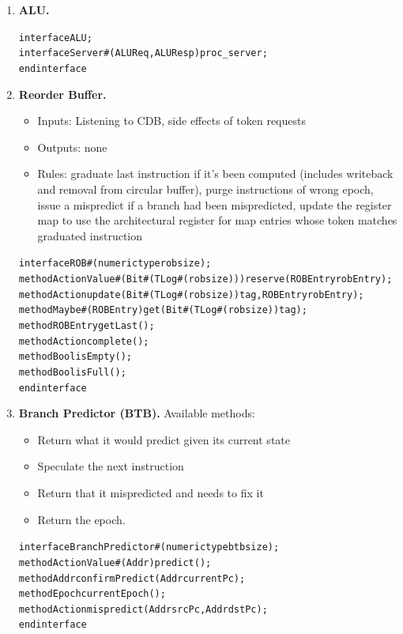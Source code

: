 \documentclass[12pt]{article}
\begin{document}
\begin{enumerate}
    \item \textbf{ALU.}
    \begin{alltt}
        interface ALU;
            interface Server#(ALUReq, ALUResp) proc_server;
        endinterface
    \end{alltt}
    
    \item \textbf{Reorder Buffer.}
    \begin{itemize}
        \item[] Inputs: Listening to CDB, side effects of token requests
        \item[] Outputs: none
        \item[] Rules: graduate last instruction if it's been computed (includes writeback and removal from circular
        buffer), purge instructions of wrong epoch, issue a mispredict if a branch had been mispredicted, update the register map to use the architectural register for map entries whose token matches graduated instruction
    \end{itemize}
    \begin{alltt}
        interface ROB#(numeric type robsize);
          method ActionValue#(Bit#(TLog#(robsize))) reserve(ROBEntry robEntry);
          method Action update(Bit#(TLog#(robsize)) tag, ROBEntry robEntry);
          method Maybe#(ROBEntry) get(Bit#(TLog#(robsize)) tag);
          method ROBEntry getLast();
          method Action complete();
          method Bool isEmpty();
          method Bool isFull();
        endinterface
    \end{alltt}

    \item \textbf{Branch Predictor (BTB).} Available methods:
        \begin{itemize}
            \item[] Return what it would predict given its current state
            \item[] Speculate the next instruction
            \item[] Return that it mispredicted and needs to fix it
            \item[] Return the epoch.
        \end{itemize}

    \begin{alltt}
        interface BranchPredictor#(numeric type btbsize);
        	method ActionValue#(Addr) predict();
        	method Addr confirmPredict(Addr currentPc);
        	method Epoch currentEpoch();
        	method Action mispredict(Addr srcPc, Addr dstPc);
        endinterface
    \end{alltt}

\end{enumerate}
\end{document}
